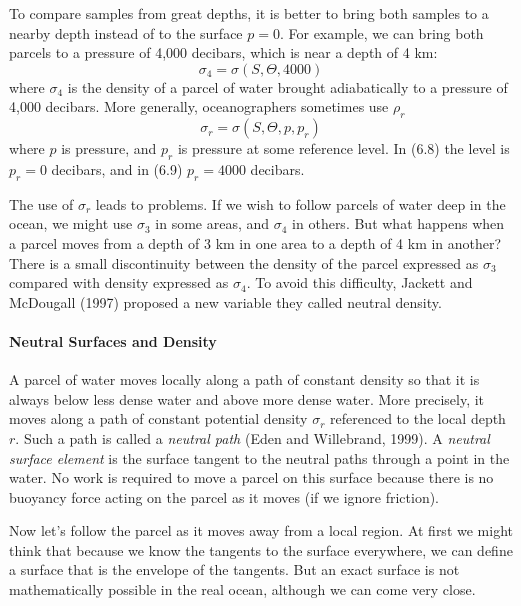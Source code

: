 To compare samples from great depths, it is better to bring both
samples to a nearby depth instead of to the surface $p = 0$. For
example, we can bring both parcels to a pressure of 4,000 decibars,
which is near a depth of 4 km:
\begin{equation}
\sigma_4 = \sigma(S, \Theta, 4000)
\end{equation}
where $\sigma_4$ is the density of a parcel of water brought
adiabatically to a pressure of 4,000 decibars. More generally,
oceanographers sometimes use $\rho_r$
\begin{equation}
\sigma _r = \sigma(S, \Theta, p, p_r)
\end{equation}
where $p$ is pressure, and $p_r$ is pressure at some reference
level. In (6.8) the level is $p_r = 0$ decibars, and in (6.9)
$p_r = 4000$ decibars.

The use of $\sigma_r$ leads to problems. If we wish to follow parcels
of water deep in the ocean, we might use $\sigma_3$ in some areas, and
$\sigma_4$ in others.  But what happens when a parcel moves from a
depth of 3 km in one area to a depth of 4 km in another? There is a
small discontinuity between the density of the parcel expressed as
$\sigma_3$ compared with density expressed as $\sigma_4$. To avoid
this difficulty, Jackett and McDougall (1997) proposed a new variable
they called neutral density.

\paragraph{Neutral Surfaces and Density}
A parcel of
water moves locally along a path of constant density so that it is
always below less dense water and above more dense water. More
precisely, it moves along a path of constant potential density
$\sigma_r$ referenced to the local depth $r$. Such a path is called a
\textit{neutral path} (Eden and Willebrand,
1999). A \textit{neutral surface element} is the surface tangent to the neutral paths through a
point in the water. No work is required to move a parcel on this
surface because there is no buoyancy force acting on
the parcel as it moves (if we ignore friction).

Now let's follow the parcel as it moves away from a local region. At
first we might think that because we know the tangents to the surface
everywhere, we can define a surface that is the envelope of the
tangents. But an exact surface is not mathematically possible in the
real ocean, although we can come very close.

